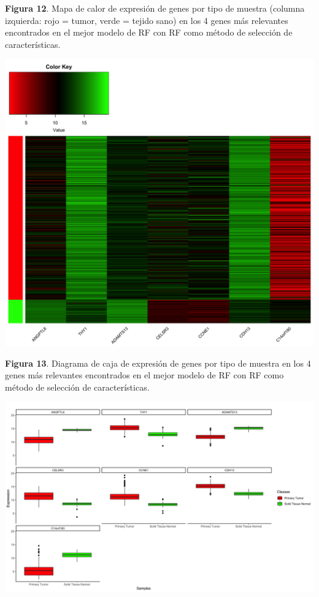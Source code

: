 \textbf{Figura 12}. Mapa de calor de expresión de genes por tipo de muestra (columna izquierda: rojo = tumor, verde = tejido sano) en los 4 genes más relevantes encontrados en el mejor modelo de RF con RF como método de selección de características.
\begin{center}
	\includegraphics[width=1\textwidth]{figuras/12_higado_biclase_29_rf_heatmap_mejor_metodo.png} 
\end{center}

\newpage
\textbf{Figura 13}. Diagrama de caja de expresión de genes por tipo de muestra en los 4 genes más relevantes encontrados en el mejor modelo de RF con RF como método de selección de características.
\begin{center}
	\includegraphics[width=1\textwidth]{figuras/13_higado_biclase_30_rf_boxplots_mejor_metodo.png} 
\end{center}


